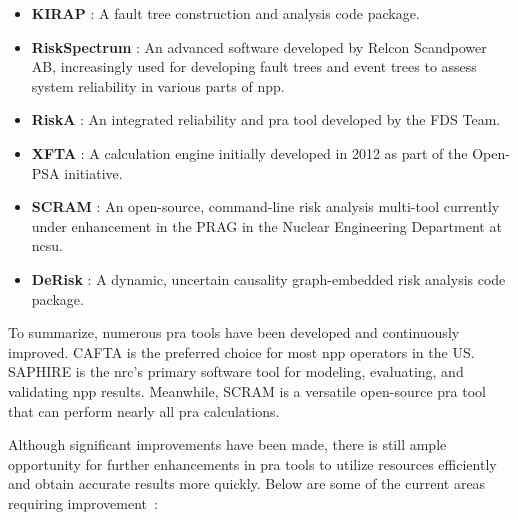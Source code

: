 \begin{itemize}
\item \textbf{KIRAP} \cite{29}: A fault tree construction and analysis code package.

\item \textbf{RiskSpectrum} \cite{30}: An advanced software developed by Relcon Scandpower AB, increasingly used for developing fault trees and event trees to assess system reliability in various parts of \acrshort{npp}.

\item \textbf{RiskA} \cite{31}: An integrated reliability and \acrshort{pra} tool developed by the FDS Team.

\item \textbf{XFTA} \cite{32}: A calculation engine initially developed in 2012 as part of the Open-PSA initiative.

\item \textbf{SCRAM} \cite{33}: An open-source, command-line risk analysis multi-tool currently under enhancement in the PRAG in the Nuclear Engineering Department at \acrshort{ncsu}.

\item \textbf{DeRisk} \cite{34}: A dynamic, uncertain causality graph-embedded risk analysis code package.
\end{itemize}

To summarize, numerous \acrshort{pra} tools have been developed and continuously improved. CAFTA is the preferred choice for most \acrshort{npp} operators in the US. SAPHIRE is the \acrshort{nrc}'s primary software tool for modeling, evaluating, and validating \acrshort{npp} results. Meanwhile, SCRAM is a versatile open-source \acrshort{pra} tool that can perform nearly all \acrshort{pra} calculations.

Although significant improvements have been made, there is still ample opportunity for further enhancements in \acrshort{pra} tools to utilize resources efficiently and obtain accurate results more quickly. Below are some of the current areas requiring improvement~\cite{35}:

